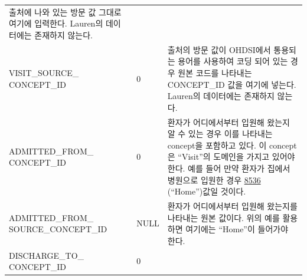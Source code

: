 \documentclass[11pt]{book}
\theoremstyle{definition}
\theoremstyle{definition}
\theoremstyle{definition}
\theoremstyle{remark}
\begin{document}
\begin{longtable}[]{@{}lll@{}}
\begin{minipage}[t]{0.48\columnwidth}
출처에 나와 있는 방문 값 그대로 여기에 입력한다. Lauren의 데이터에는
존재하지 않는다.\strut
\end{minipage}\tabularnewline
\begin{minipage}[t]{0.28\columnwidth}\raggedright\strut
VISIT\_SOURCE\_ CONCEPT\_ID\strut
\end{minipage} & \begin{minipage}[t]{0.16\columnwidth}\raggedright\strut
0\strut
\end{minipage} & \begin{minipage}[t]{0.48\columnwidth}\raggedright\strut
출처의 방문 값이 OHDSI에서 통용되는 용어를 사용하여 코딩 되어 있는 경우
원본 코드를 나타내는 CONCEPT\_ID 값을 여기에 넣는다. Lauren의 데이터에는
존재하지 않는다.\strut
\end{minipage}\tabularnewline
\begin{minipage}[t]{0.28\columnwidth}\raggedright\strut
ADMITTED\_FROM\_ CONCEPT\_ID\strut
\end{minipage} & \begin{minipage}[t]{0.16\columnwidth}\raggedright\strut
0\strut
\end{minipage} & \begin{minipage}[t]{0.48\columnwidth}\raggedright\strut
환자가 어디에서부터 입원해 왔는지 알 수 있는 경우 이를 나타내는
concept을 포함하고 있다. 이 concept은 ``Visit''의 도메인을 가지고 있어야
한다. 예를 들어 만약 환자가 집에서 병원으로 입원한 경우
\href{http://athena.ohdsi.org/search-terms/terms/8536}{8536}
(``Home'')값일 것이다.\strut
\end{minipage}\tabularnewline
\begin{minipage}[t]{0.28\columnwidth}\raggedright\strut
ADMITTED\_FROM\_ SOURCE\_CONCEPT\_ID\strut
\end{minipage} & \begin{minipage}[t]{0.16\columnwidth}\raggedright\strut
NULL\strut
\end{minipage} & \begin{minipage}[t]{0.48\columnwidth}\raggedright\strut
환자가 어디에서부터 입원해 왔는지를 나타내는 원본 값이다. 위의 예를
활용하면 여기에는 ``Home''이 들어가야 한다.\strut
\end{minipage}\tabularnewline
\begin{minipage}[t]{0.28\columnwidth}\raggedright\strut
DISCHARGE\_TO\_ CONCEPT\_ID\strut
\end{minipage} & \begin{minipage}[t]{0.16\columnwidth}\raggedright\strut
0\strut
\end{minipage} & \begin{minipage}[t]{0.48\columnwidth}\raggedright\strut

\end{minipage}
\end{longtable}
\end{document}
